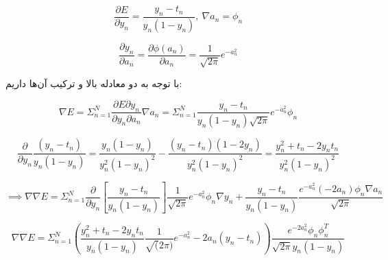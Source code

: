 
$$
\frac{\partial E}{\partial y_n} = \frac{y_n - t_n}{y_n (1 - y_n)}, \:  \nabla  a_n = \phi_n
$$

$$
\frac{\partial y_n}{\partial a_n} = \frac{\partial \phi(a_n)}{\partial a_n} = \frac{1}{\sqrt{2\pi}}e^{-a_n^2}
$$

با توجه به دو معادله بالا و ترکیب آن‌ها داریم:

$$
\nabla E = \Sigma_{n = 1}^{N}\frac{\partial E \partial y_n}{\partial y_n \partial a_n}\nabla a_n = \Sigma_{n = 1}^{N}\frac{y_n - t_n}{y_n (1 - y_n) \sqrt{2\pi}}e^{-a_n^2}\phi_n
$$

$$
\frac{\partial }{\partial y_n } \frac{(y_n - t_n)}{y_n(1 - y_n)} = \frac{y_n(1-y_n)}{y_n^2(1 - y_n)^2} - \frac{(y_n - t_n)(1 - 2y_n)}{y_n^2(1-y_n)^2} = \frac{y_n^2 + t_n - 2y_nt_n}{y_n^2(1 - y_n)^2}
$$

$$
\implies \nabla \nabla E = \Sigma_{n = 1}^{N}{\frac{\partial}{\partial y_n}[\frac{y_n - t_n}{y_n (1 - y_n)}]\frac{1}{\sqrt{2\pi}}e^{-a_n^2} \phi_n \nabla y_n + \frac{y_n - t_n}{y_n(1 - y_n)} \frac{e^{-a_n^2}(-2a_n)\phi_n\nabla a_n}{\sqrt{2\pi}}}
$$

$$
\nabla \nabla E 
= \Sigma_{n = 1}^N(\frac{y_n^2 + t_n - 2y_nt_n}{y_n(1-y_n)}\frac{1}{\sqrt(2\pi)}e^{-a_n^2} - 2a_n(y_n - t_n))\frac{e^{-2a_n^2}\phi_n\phi_n^T}{\sqrt{2\pi}y_n(1-y_n)}
$$